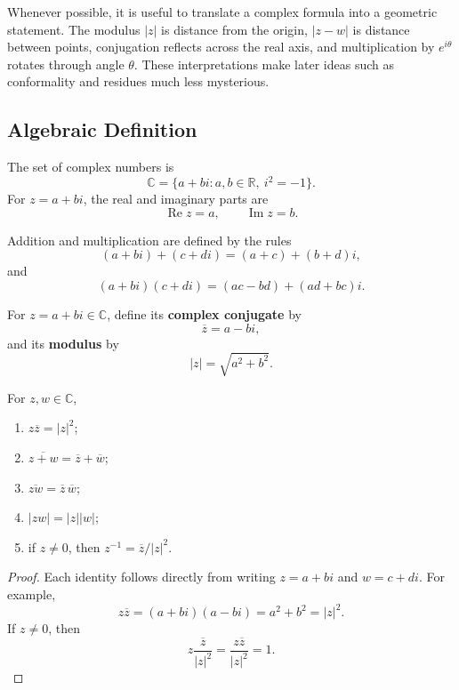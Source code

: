 Whenever possible, it is useful to translate a complex formula into a geometric statement. The modulus $|z|$ is distance from the origin, $|z-w|$ is distance between points, conjugation reflects across the real axis, and multiplication by $e^{i\theta}$ rotates through angle $\theta$. These interpretations make later ideas such as conformality and residues much less mysterious.

\subsection{Algebraic Definition}

\begin{definition}
The set of complex numbers is
\[
    \mathbb{C}=\{a+bi:a,b\in\mathbb{R},\ i^2=-1\}.
\]
For $z=a+bi$, the real and imaginary parts are
\[
    \operatorname{Re}z=a,
    \qquad
    \operatorname{Im}z=b.
\]
\end{definition}

Addition and multiplication are defined by the rules
\[
    (a+bi)+(c+di)=(a+c)+(b+d)i,
\]
and
\[
    (a+bi)(c+di)=(ac-bd)+(ad+bc)i.
\]

\begin{definition}
For $z=a+bi\in\mathbb{C}$, define its \textbf{complex conjugate} by
\[
    \overline{z}=a-bi,
\]
and its \textbf{modulus} by
\[
    |z|=\sqrt{a^2+b^2}.
\]
\end{definition}

\begin{proposition}
For $z,w\in\mathbb{C}$,
\begin{enumerate}
    \item $z\overline{z}=|z|^2$;
    \item $\overline{z+w}=\overline{z}+\overline{w}$;
    \item $\overline{zw}=\overline{z}\,\overline{w}$;
    \item $|zw|=|z||w|$;
    \item if $z\neq 0$, then $z^{-1}=\overline{z}/|z|^2$.
\end{enumerate}
\end{proposition}

\begin{proof}
Each identity follows directly from writing $z=a+bi$ and $w=c+di$. For example,
\[
    z\overline{z}=(a+bi)(a-bi)=a^2+b^2=|z|^2.
\]
If $z\neq 0$, then
\[
    z\frac{\overline{z}}{|z|^2}=\frac{z\overline{z}}{|z|^2}=1.
\]
\end{proof}

